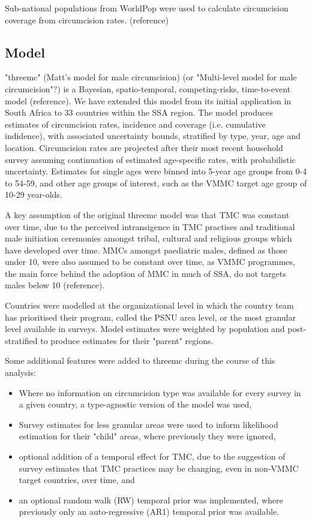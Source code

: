 \documentclass[a4paper, 12pt]{article}
\begin{document}
Sub-national populations from WorldPop were used to calculate circumcision coverage from circumcision rates. (reference)

\subsection{Model}
\label{sec:org681dda6}

"threemc" (Matt's model for male circumcision) (or "Multi-level model for male circumcision"?) is
a Bayesian, spatio-temporal, competing-risks, time-to-event model (reference). We have extended
this model from its initial application in South Africa to
33
countries within the SSA region. The model produces estimates of circumcision rates, incidence and coverage (i.e. cumulative indidence), with associated uncertainty bounds, stratified by type, year, age and location. Circumcision rates are projected after their most recent household survey
assuming continuation of estimated age-specific rates, with probabilistic uncertainty. Estimates
for single ages were binned into 5-year age groups from 0-4 to 54-59, and other age groups of interest, such as the VMMC target age group of 10-29 year-olds.

A key assumption of the original threemc model was that TMC was constant over time, due to the perceived intransigence in TMC practises and traditional male initiation ceremonies amongst tribal, cultural and religious groups which have developed over time. MMCs amongst paediatric males, defined as those under 10, were also assumed to be constant over time, as VMMC programmes, the  main force behind the adoption of MMC in much of SSA, do not targets males below 10 (reference).

Countries were modelled at the organizational level in which the country team has prioritised their program, called the PSNU area level, or the most granular level available in surveys. Model estimates were weighted by population and post-stratified to produce estimates for their "parent" regions. 

Some additional features were added to threemc during the course of this analysis: 
\begin{itemize}
\item Where no information on circumcision type was available for every survey in a given country, a type-agnostic version of the model was used,
\item Survey estimates for less granular areas were used to inform likelihood estimation for their "child" areas, where previously they were ignored,
\item optional addition of a temporal effect for TMC, due to the suggestion of survey estimates that TMC practices may be changing, even in non-VMMC target countries, over time, and
\item an optional random walk (RW) temporal prior was implemented, where previously only an auto-regressive (AR1) temporal prior was available.
\end{itemize}
\end{document}
